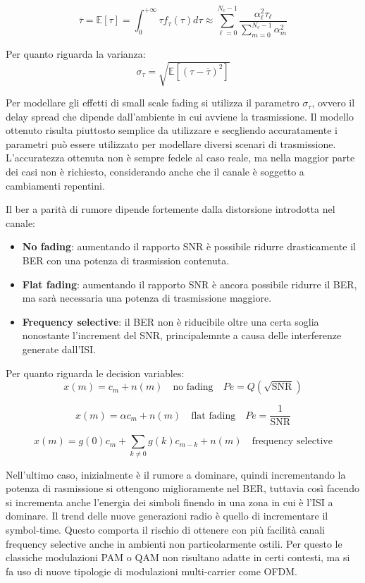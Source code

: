 \[
   \overline{\tau} = \mathbb{E} \left[\tau\right] = \int_{0}^{+\infty} \tau f_{\tau}(\tau) d\tau \approx \sum_{\ell=0}^{N_c-1} \frac{\alpha_{\ell}^2 \tau_{\ell}}{\sum_{m=0}^{N_c-1} \alpha_{m}^2}
\]

Per quanto riguarda la varianza:
\[  
    \sigma_\tau = \sqrt{\mathbb{E}\left[({\tau - \overline{\tau}})^2\right]}
\]

Per modellare gli effetti di small scale fading si utilizza il parametro $\sigma_\tau$, ovvero il delay spread che dipende dall'ambiente in cui avviene la trasmissione. Il modello ottenuto risulta piuttosto semplice da utilizzare e secgliendo accuratamente i parametri può essere utilizzato per modellare diversi scenari di trasmissione. L'accuratezza ottenuta non è sempre fedele al caso reale, ma nella maggior parte dei casi non è richiesto, considerando anche che il canale è soggetto a cambiamenti repentini.

Il ber a parità di rumore dipende fortemente dalla distorsione introdotta nel canale:
\begin{itemize}
    \item \textbf{No fading}: aumentando il rapporto SNR è possibile ridurre drasticamente il BER con una potenza di trasmission contenuta.
    \item \textbf{Flat fading}: aumentando il rapporto SNR è ancora possibile ridurre il BER, ma sarà necessaria una potenza di trasmissione maggiore.
    \item \textbf{Frequency selective}: il BER non è riducibile oltre una certa soglia nonostante l'increment del SNR, principalemnte a causa delle interferenze generate dall'ISI.
\end{itemize}

Per quanto riguarda le decision variables:
\[
    x(m) = c_m + n(m) \quad \text{no fading} \quad Pe = Q(\sqrt{\text{SNR}})
\]

\[
    x(m) = \alpha c_m + n(m) \quad \text{flat fading} \quad Pe = \frac{1}{\text{SNR}}
\]

\[
    x(m) = g(0) c_m + \sum_{k \neq 0} g(k) c_{m-k} + n(m) \quad \text{frequency selective}  
\]

Nell'ultimo caso, inizialmente è il rumore a dominare, quindi incrementando la potenza di rasmissione si ottengono miglioramente nel BER, tuttavia così facendo si incrementa anche l'energia dei simboli finendo in una zona in cui è l'ISI a dominare.
Il trend delle nuove generazioni radio è quello di incrementare il symbol-time. Questo comporta il rischio di ottenere con più facilità canali frequency selective anche in ambienti non particolarmente ostili. Per questo le classiche modulazioni PAM o QAM non risultano adatte in certi contesti, ma si fa uso di nuove tipologie di modulazioni multi-carrier come OFDM.






